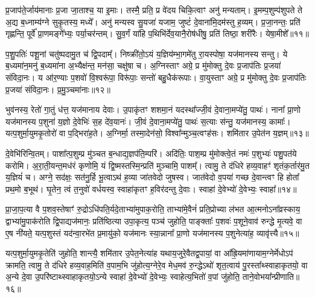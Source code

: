 प्र॒जाप॑ते॒र्जाय॑मानाः प्र॒जा जा॒ताश्च॒ या इ॒माः। तस्मै॒ प्रति॒ प्र वे॑दय चिकि॒त्वाꣳ अनु॑ मन्यताम्। इ॒मम्प॒शुम्प॑शुपते ते अ॒द्य ब॒ध्नाम्य॑ग्ने सुकृ॒तस्य॒ मध्ये᳚। अनु॑ मन्यस्व सु॒यजा॑ यजाम॒ जुष्टं॑ दे॒वाना॑मि॒दम॑स्तु ह॒व्यम्। प्र॒जा॒नन्तः॒ प्रति॑ गृह्णन्ति॒ पूर्वे᳚ प्रा॒णमङ्गे᳚भ्यः॒ पर्या॒चर॑न्तम्। सु॒व॒र्गं या॑हि प॒थिभि॑र्देव॒यानै॒रोष॑धीषु॒ प्रति॑ तिष्ठा॒ शरी॑रैः। येषा॒मीशे᳚॥११॥

प॒शु॒पतिः॑ पशू॒नां चतु॑ष्पदामु॒त च॑ द्वि॒पदाम्᳚। निष्क्री॑तो॒\-ऽयं य॒ज्ञिय॑म्भा॒गमे॑तु रा॒यस्पोषा॒ यज॑मानस्य सन्तु। ये ब॒ध्यमा॑न॒मनु॑ ब॒ध्यमा॑ना अ॒भ्यैक्ष॑न्त॒ मन॑सा॒ चक्षु॑षा च। अ॒ग्निस्ताꣳ अग्रे॒ प्र मु॑मोक्तु दे॒वः प्र॒जाप॑तिः प्र॒जया॑ संविदा॒नः। य आ॑र॒ण्याः प॒शवो॑ वि॒श्वरू॑पा॒ विरू॑पाः॒ सन्तो॑ बहु॒धैक॑रूपाः। वा॒युस्ताꣳ अग्रे॒ प्र मु॑मोक्तु दे॒वः प्र॒जाप॑तिः प्र॒जया॑ संविदा॒नः। प्र॒मु॒ञ्चमा॑नाः॥१२॥

भुव॑नस्य॒ रेतो॑ गा॒तुं ध॑त्त॒ यज॑मानाय देवाः। उ॒पाकृ॑तꣳ शशमा॒नं यदस्था᳚ज्जी॒वं दे॒वाना॒मप्ये॑तु॒ पाथः॑। नाना᳚ प्रा॒णो यज॑मानस्य प॒शुना॑ य॒ज्ञो दे॒वेभिः॑ स॒ह दे॑व॒यानः॑। जी॒वं दे॒वाना॒मप्ये॑तु॒ पाथः॑ स॒त्याः स॑न्तु॒ यज॑मानस्य॒ कामाः᳚। यत्प॒शुर्मा॒युमकृ॒तोरो॑ वा प॒द्भिरा॑ह॒ते। अ॒ग्निर्मा॒ तस्मा॒देन॑सो॒ विश्वा᳚न्मुञ्च॒त्वꣳह॑सः। शमि॑तार उ॒पेत॑न य॒ज्ञम्॥१३॥

दे॒वेभि॑रिन्वि॒तम्। पाशा᳚त्प॒शुम्प्र मु॑ञ्चत ब॒न्धाद्य॒ज्ञप॑ति॒म्परि॑। अदि॑तिः॒ पाश॒म्प्र मु॑मोक्त्वे॒तं नमः॑ प॒शुभ्यः॑ पशु॒पत॑ये करोमि। अ॒रा॒ती॒यन्त॒मध॑रं कृणोमि॒ यं द्वि॒ष्मस्तस्मि॒न्प्रति॑ मुञ्चामि॒ पाशम्᳚। त्वामु॒ ते द॑धिरे हव्य॒वाहꣳ॑ शृतंक॒र्तार॑मु॒त य॒ज्ञियं॑ च। अग्ने॒ सद॑क्षः॒ सत॑नु॒र्\mbox{}हि भू॒त्वा\-ऽथ॑ ह॒व्या जा॑तवेदो जुषस्व। जात॑वेदो व॒पया॑ गच्छ दे॒वान्त्वꣳ हि होता᳚ प्रथ॒मो ब॒भूथ॑। घृ॒तेन॒ त्वं त॒नुवो॑ वर्धयस्व॒ स्वाहा॑कृतꣳ ह॒विर॑दन्तु दे॒वाः। स्वाहा॑ दे॒वेभ्यो॑ दे॒वेभ्यः॒ स्वाहा᳚॥१४॥

{\anuvakamend[{ईशे᳚ प्रमु॒ञ्चमा॑ना य॒ज्ञन्त्वꣳ षोड॑श च॥४॥}]}

प्रा॒जा॒प॒त्या वै प॒शव॒स्तेषाꣳ॑ रु॒द्रो\-ऽधि॑पति॒र्यदे॒ताभ्या॑मुपाक॒रोति॒ ताभ्या॑मे॒वैनं॑ प्रति॒प्रोच्या ल॑भत आ॒त्मनो\-ऽना᳚व्रस्काय॒ द्वाभ्या॑मु॒पाक॑रोति द्वि॒पाद्यज॑मानः॒ प्रति॑ष्ठित्या उपा॒कृत्य॒ पञ्च॑ जुहोति॒ पाङ्क्ताः᳚ प॒शवः॑ प॒शूने॒वाव॑ रुन्द्धे मृ॒त्यवे॒ वा ए॒ष नी॑यते॒ यत्प॒शुस्तं यद॑न्वा॒रभे॑त प्र॒मायु॑को॒ यज॑मानः स्या॒न्नाना᳚ प्रा॒णो यज॑मानस्य प॒शुनेत्या॑ह॒ व्यावृ॑त्त्यै॥१५॥

यत्प॒शुर्मा॒युमकृ॒तेति॑ जुहोति॒ शान्त्यै॒ शमि॑तार उ॒पेत॒नेत्या॑ह यथाय॒जुरे॒वैतद्व॒पायां॒ वा आ᳚ह्रि॒यमा॑णायाम॒ग्नेर्मेधो\-ऽप॑ क्रामति॒ त्वामु॒ ते द॑धिरे हव्य॒वाह॒मिति॑ व॒पाम॒भि जु॑होत्य॒ग्नेरे॒व मेध॒मव॑ रु॒न्द्धे\-ऽथो॑ शृत॒त्वाय॑ पु॒रस्ता᳚थ्स्वाहाकृतयो॒ वा अ॒न्ये दे॒वा उ॒परि॑ष्टाथ्स्वाहाकृतयो॒\-ऽन्ये स्वाहा॑ दे॒वेभ्यो॑ दे॒वेभ्यः॒ स्वाहेत्य॒भितो॑ व॒पां जु॑होति॒ ताने॒वोभया᳚न्प्रीणाति॥१६॥


